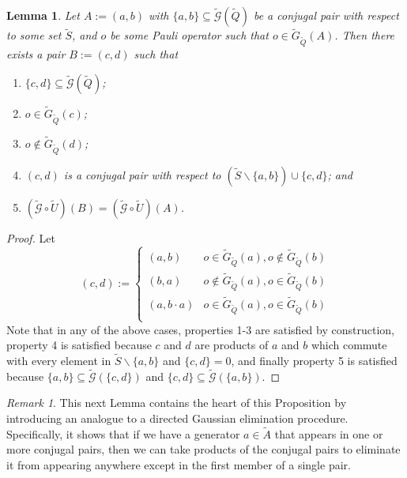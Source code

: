 \documentclass[12pt]{amsbook}
\theoremstyle{plain}
\newtheorem{lemma}{Lemma}
\theoremstyle{definition}
\theoremstyle{remark}
\newtheorem{remark}{Remark}
\newcommand{\set}{\tilde}
\newcommand{\genfun}{\tilde{\mathcal{G}}}
\newcommand{\paren}[1]{\left(#1\right)}
\begin{document}
\begin{lemma}
\label{single-pair-rearrangement}
Let $A:=(a,b)$ with $\{a,b\}\subseteq\genfun(\set Q)$ be a conjugal pair with respect to some set $\set S$, and $o$ be some Pauli operator such that $o\in\set G_{\set Q}(A)$.  Then there exists a pair $B:=(c,d)$ such that
\begin{enumerate}
\item $\{c,d\}\subseteq\genfun(\set Q)$;
\item $o\in \set G_{\set Q}(c)$;
\item $o\notin \set G_{\set Q}(d)$;
\item $(c,d)$ is a conjugal pair with respect to $\paren{\set S\backslash \{a,b\}}\cup\{c,d\}$; and
\item $(\genfun\circ\set U)(B) = (\genfun\circ\set U)(A)$.
\end{enumerate}
\end{lemma}

\begin{proof}
Let
$$
(c,d):=
\begin{cases}
\paren{a,b} & o\in \set G_{\set Q}(a), o\notin \set G_{\set Q}(b) \\
\paren{b,a} &  o\notin \set G_{\set Q}(a), o\in \set G_{\set Q}(b) \\
\paren{a,b\cdot a} & o\in \set G_{\set Q}(a), o\in \set G_{\set Q}(b) \\
\end{cases}
$$
Note that in any of the above cases, properties 1-3 are satisfied by construction, property 4 is satisfied because $c$ and $d$ are products of $a$ and $b$ which commute with every element in $\set S\backslash \{a,b\}$ and $\{c,d\}=0$, and finally property 5 is satisfied because $\{a,b\}\subseteq \genfun\paren{\{c,d\}}$ and $\{c,d\}\subseteq \genfun\paren{\{a,b\}}$.
\end{proof}
\begin{remark}
This next Lemma contains the heart of this Proposition by introducing an analogue to a directed Gaussian elimination procedure.  Specifically, it shows that if we have a generator $a\in\set A$ that appears in one or more conjugal pairs, then we can take products of the conjugal pairs to eliminate it from appearing anywhere except in the first member of a single pair.
\end{remark}
\end{document}
